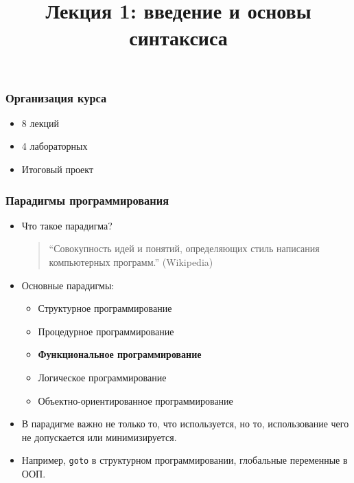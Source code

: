 \documentclass[10pt]{beamer}
\title{Лекция 1: введение и основы синтаксиса}
\begin{document}
\begin{frame}[plain]
  \maketitle
\end{frame}

\begin{frame}
  \frametitle{Организация курса}
  \begin{itemize}
    \item 8 лекций
    \item 4 лабораторных
    \item Итоговый проект
  \end{itemize}
\end{frame}

\begin{frame}
  \frametitle{Парадигмы программирования}
  \begin{itemize}
    \item Что такое парадигма?
          \pause
          \begin{quote}
            \enquote{Совокупность идей и понятий, определяющих стиль написания компьютерных программ.} (Wikipedia)
          \end{quote}
          \pause
    \item Основные парадигмы:
          \pause
          \begin{itemize}
            \item Структурное программирование
            \item Процедурное программирование
            \item \textbf{Функциональное программирование}
            \item Логическое программирование
            \item Объектно-ориентированное программирование
          \end{itemize}
          \pause
    \item В парадигме важно не только то, что используется, но то, использование чего не допускается или минимизируется.
          \pause
    \item Например, \lstinline!goto! в структурном программировании, глобальные переменные в ООП.
  \end{itemize}
\end{frame}
\end{document}
